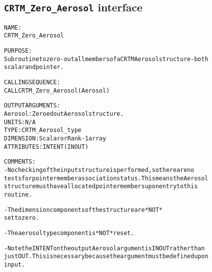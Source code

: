 \subsection{\texttt{CRTM\_Zero\_Aerosol} interface}
  \label{sec:CRTM_Zero_Aerosol_interface}
  \begin{alltt}
 
  NAME:
        CRTM_Zero_Aerosol
  
  PURPOSE:
        Subroutine to zero-out all members of a CRTM Aerosol structure - both
        scalar and pointer.
 
  CALLING SEQUENCE:
        CALL CRTM_Zero_Aerosol( Aerosol )
 
  OUTPUT ARGUMENTS:
        Aerosol: Zeroed out Aerosol structure.
                 UNITS:      N/A
                 TYPE:       CRTM_Aerosol_type
                 DIMENSION:  Scalar or Rank-1 array
                 ATTRIBUTES: INTENT(IN OUT)
 
  COMMENTS:
        - No checking of the input structure is performed, so there are no
          tests for pointer member association status. This means the Aerosol
          structure must have allocated pointer members upon entry to this
          routine.
 
        - The dimension components of the structure are *NOT*
          set to zero.
 
        - The aerosol type component is *NOT* reset.
 
        - Note the INTENT on the output Aerosol argument is IN OUT rather than
          just OUT. This is necessary because the argument must be defined upon
          input.
 
  \end{alltt}
